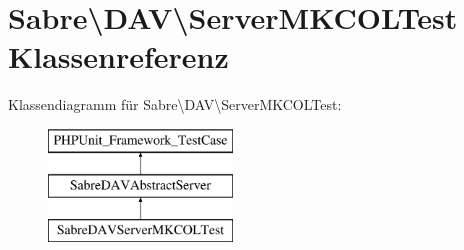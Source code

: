 \hypertarget{class_sabre_1_1_d_a_v_1_1_server_m_k_c_o_l_test}{}\section{Sabre\textbackslash{}D\+AV\textbackslash{}Server\+M\+K\+C\+O\+L\+Test Klassenreferenz}
\label{class_sabre_1_1_d_a_v_1_1_server_m_k_c_o_l_test}
Klassendiagramm für Sabre\textbackslash{}D\+AV\textbackslash{}Server\+M\+K\+C\+O\+L\+Test\+:\begin{figure}[H]
\begin{center}
\leavevmode
\includegraphics[height=3.000000cm]{class_sabre_1_1_d_a_v_1_1_server_m_k_c_o_l_test}
\end{center}
\end{figure}
